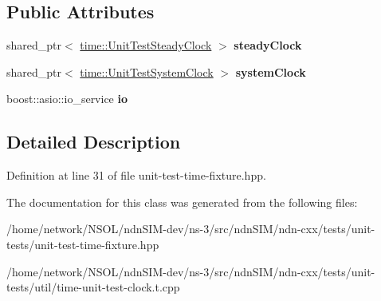 \subsection*{Public Attributes}
\begin{DoxyCompactItemize}
\item 
shared\+\_\+ptr$<$ \hyperlink{classndn_1_1time_1_1UnitTestClock}{time\+::\+Unit\+Test\+Steady\+Clock} $>$ {\bfseries steady\+Clock}\hypertarget{classndn_1_1tests_1_1UnitTestTimeFixture_a93ef376c11a3380fc19d68631a2503dc}{}\label{classndn_1_1tests_1_1UnitTestTimeFixture_a93ef376c11a3380fc19d68631a2503dc}

\item 
shared\+\_\+ptr$<$ \hyperlink{classndn_1_1time_1_1UnitTestClock}{time\+::\+Unit\+Test\+System\+Clock} $>$ {\bfseries system\+Clock}\hypertarget{classndn_1_1tests_1_1UnitTestTimeFixture_ae035ded00be805850a0ad4574fb957d9}{}\label{classndn_1_1tests_1_1UnitTestTimeFixture_ae035ded00be805850a0ad4574fb957d9}

\item 
boost\+::asio\+::io\+\_\+service {\bfseries io}\hypertarget{classndn_1_1tests_1_1UnitTestTimeFixture_af5c27fc117720e8b7f6e295bb2f85724}{}\label{classndn_1_1tests_1_1UnitTestTimeFixture_af5c27fc117720e8b7f6e295bb2f85724}

\end{DoxyCompactItemize}


\subsection{Detailed Description}


Definition at line 31 of file unit-\/test-\/time-\/fixture.\+hpp.



The documentation for this class was generated from the following files\+:\begin{DoxyCompactItemize}
\item 
/home/network/\+N\+S\+O\+L/ndn\+S\+I\+M-\/dev/ns-\/3/src/ndn\+S\+I\+M/ndn-\/cxx/tests/unit-\/tests/unit-\/test-\/time-\/fixture.\+hpp\item 
/home/network/\+N\+S\+O\+L/ndn\+S\+I\+M-\/dev/ns-\/3/src/ndn\+S\+I\+M/ndn-\/cxx/tests/unit-\/tests/util/time-\/unit-\/test-\/clock.\+t.\+cpp\end{DoxyCompactItemize}
